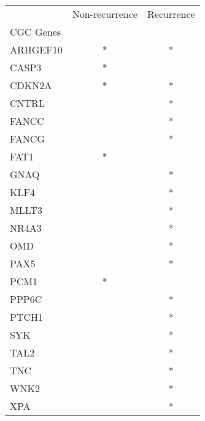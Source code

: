 \begin{tabular}{lcc}
\toprule
{} & Non-recurrence & Recurrence \\
CGC Genes &                &            \\
\midrule
ARHGEF10  &              * &          * \\
CASP3     &              * &            \\
CDKN2A    &              * &          * \\
CNTRL     &                &          * \\
FANCC     &                &          * \\
FANCG     &                &          * \\
FAT1      &              * &            \\
GNAQ      &                &          * \\
KLF4      &                &          * \\
MLLT3     &                &          * \\
NR4A3     &                &          * \\
OMD       &                &          * \\
PAX5      &                &          * \\
PCM1      &              * &            \\
PPP6C     &                &          * \\
PTCH1     &                &          * \\
SYK       &                &          * \\
TAL2      &                &          * \\
TNC       &                &          * \\
WNK2      &                &          * \\
XPA       &                &          * \\
\bottomrule
\end{tabular}
